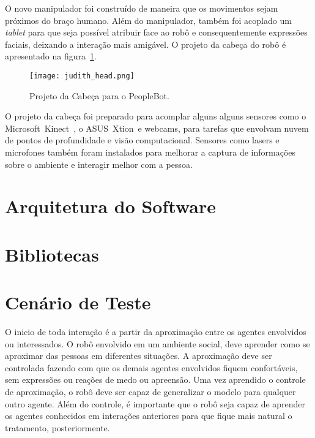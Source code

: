 O novo manipulador foi construído de maneira que os movimentos sejam próximos do braço humano. Além do manipulador, também foi acoplado um \emph{tablet} para que seja possível atribuir face ao robô e consequentemente expressões faciais, deixando a interação mais amigável. O projeto da cabeça do robô é apresentado na figura~\ref{fig:judithhead}.

\begin{figure}[ht!]
	\centering
	\begin{minipage}{0.4\textwidth}
		\caption{Projeto da Cabeça para o PeopleBot.}
		\texttt{[image: judith\_head.png]}
		\label{fig:judithhead}
	\end{minipage}
\end{figure}

O projeto da cabeça foi preparado para acomplar alguns alguns sensores como o Microsoft\textregistered\ Kinect\textregistered\ , o ASUS\textregistered\ Xtion\textregistered\ e webcams, para tarefas que envolvam nuvem de pontos de profundidade e visão computacional. Sensores como lasers e microfones também foram instalados para melhorar a captura de informações sobre o ambiente e interagir melhor com a pessoa.

\section{Arquitetura do Software}
\label{sec:arquitetura}

\section{Bibliotecas}
\label{sec:bibliotecas}

\section{Cenário de Teste} %
\label{sec:cenario}
O inicio de toda interação é a partir da aproximação entre os agentes envolvidos ou interessados. O robô envolvido em um ambiente social, deve aprender como se aproximar das pessoas em diferentes situações. A aproximação deve ser controlada fazendo com que os demais agentes envolvidos fiquem confortáveis, sem expressões ou reações de medo ou apreensão. Uma vez aprendido o controle de aproximação, o robô deve ser capaz de generalizar o modelo para qualquer outro agente. Além do controle, é importante que o robô seja capaz de aprender os agentes conhecidos em interações anteriores para que fique mais natural o tratamento, posteriormente.

